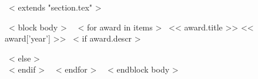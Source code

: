 ~< extends "section.tex" >~

~< block body >~
~< for award in items >~
  << award.title >> \hfill {\small \color{teal} << award['year'] >>}
  ~< if award.descr >~
    \\ {\scriptsize \color{gray}{<< award.descr >>} \par}
  ~< else >~
    \\[0.5mm]
  ~< endif >~ \vspace*{0.2cm}
~< endfor >~
~< endblock body >~

